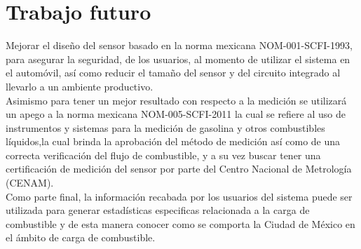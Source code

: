 \chapter{Trabajo futuro}\label{chapter8}
Mejorar el diseño del sensor basado en la norma mexicana NOM-001-SCFI-1993, para asegurar la seguridad, de los usuarios, al momento de utilizar el sistema en el automóvil, así como reducir el tamaño del sensor y del circuito integrado al llevarlo a un ambiente productivo.
\\
Asimismo para tener un mejor resultado con respecto a la medición se utilizará un apego a la norma mexicana NOM-005-SCFI-2011 la cual se refiere al uso de instrumentos y sistemas para la medición de gasolina y otros combustibles líquidos,la cual brinda la aprobación del método de medición así como de una correcta verificación del flujo de combustible, y a su vez buscar tener una certificación de medición del sensor por parte del Centro Nacional de Metrología (CENAM).
\\
Como parte final, la información recabada por los usuarios del sistema puede ser utilizada para generar estadísticas especificas relacionada a la carga de combustible y de esta manera conocer como se comporta la Ciudad de México en el ámbito de carga de combustible.